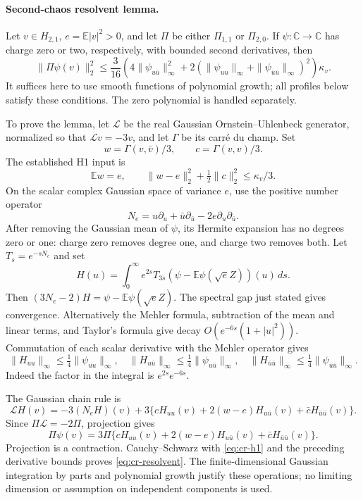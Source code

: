 \paragraph{Second-chaos resolvent lemma.}
Let $v\in H_{2,1}$, $e=\mathbb E|v|^2>0$, and let $\Pi$ be either
$\Pi_{1,1}$ or $\Pi_{2,0}$. If $\psi:\mathbb C\to\mathbb C$ has
charge zero or two, respectively, with bounded second derivatives,
then
\begin{equation}\label{eq:cr-resolvent}
 \|\Pi\psi(v)\|_2^2\le
 \frac3{16}\left(4\|\psi_{u\bar u}\|_\infty^2+
  2(\|\psi_{uu}\|_\infty+\|\psi_{\bar u\bar u}\|_\infty)^2\right)
 \kappa_v.
\end{equation}
It suffices here to use smooth functions of polynomial growth; all
profiles below satisfy these conditions. The zero polynomial is handled
separately.

To prove the lemma, let $\mathcal L$ be the real Gaussian
Ornstein--Uhlenbeck generator, normalized so that $\mathcal Lv=-3v$,
and let $\Gamma$ be its carr\'e du champ. Set
\[
 w=\Gamma(v,\bar v)/3,\qquad c=\Gamma(v,v)/3.
\]
The established H1 input is
\begin{equation}\label{eq:cr-h1}
 \mathbb Ew=e,\qquad
 \|w-e\|_2^2+\tfrac12\|c\|_2^2\le\kappa_v/3.
\end{equation}
On the scalar complex Gaussian space of variance $e$, use the positive
number operator
\[
 N_e=u\partial_u+\bar u\partial_{\bar u}
                   -2e\partial_u\partial_{\bar u}.
\]
After removing the Gaussian mean of $\psi$, its Hermite expansion has
no degrees zero or one: charge zero removes degree one, and charge two
removes both. Let $T_s=e^{-sN_e}$ and set
\[
 H(u)=\int_0^\infty e^{2s}T_{3s}
       (\psi-\mathbb E\psi(\sqrt e Z))(u)\,ds.
\]
Then $(3N_e-2)H=\psi-\mathbb E\psi(\sqrt eZ)$.
The spectral gap just stated gives convergence. Alternatively the
Mehler formula, subtraction of the mean and linear terms, and Taylor's
formula give decay $O(e^{-6s}(1+|u|^2))$.
Commutation of each scalar derivative with the Mehler operator gives
\[
 \|H_{uu}\|_\infty\le\tfrac14\|\psi_{uu}\|_\infty,
 \quad\|H_{u\bar u}\|_\infty\le\tfrac14\|\psi_{u\bar u}\|_\infty,
 \quad\|H_{\bar u\bar u}\|_\infty
                   \le\tfrac14\|\psi_{\bar u\bar u}\|_\infty.
\]
Indeed the factor in the integral is $e^{2s}e^{-6s}$.

The Gaussian chain rule is
\[
 \mathcal L H(v)=-3(N_eH)(v)+3\{cH_{uu}(v)
                +2(w-e)H_{u\bar u}(v)+\bar cH_{\bar u\bar u}(v)\}.
\]
Since $\Pi\mathcal L=-2\Pi$, projection gives
\[
 \Pi\psi(v)=3\Pi\{cH_{uu}(v)+2(w-e)H_{u\bar u}(v)
                                  +\bar cH_{\bar u\bar u}(v)\}.
\]
Projection is a contraction. Cauchy--Schwarz with
\eqref{eq:cr-h1} and the preceding derivative bounds proves
\eqref{eq:cr-resolvent}. The finite-dimensional Gaussian integration
by parts and polynomial growth justify these operations; no limiting
dimension or assumption on independent components is used.

